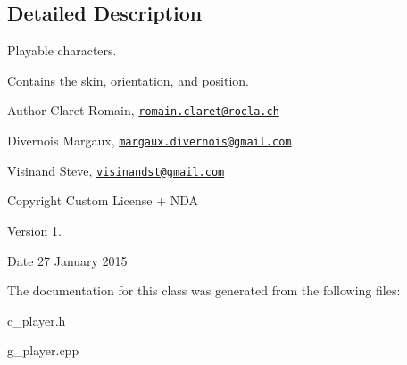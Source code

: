 \subsection{Detailed Description}
Playable characters. 

Contains the skin, orientation, and position. \begin{DoxyAuthor}{Author}
Claret Romain, \href{mailto:romain.claret@rocla.ch}{\tt romain.\+claret@rocla.\+ch} 

Divernois Margaux, \href{mailto:margaux.divernois@gmail.com}{\tt margaux.\+divernois@gmail.\+com} 

Visinand Steve, \href{mailto:visinandst@gmail.com}{\tt visinandst@gmail.\+com} 
\end{DoxyAuthor}
\begin{DoxyCopyright}{Copyright}
Custom License + N\+D\+A 
\end{DoxyCopyright}
\begin{DoxyVersion}{Version}
1. 
\end{DoxyVersion}
\begin{DoxyDate}{Date}
27 January 2015 
\end{DoxyDate}


The documentation for this class was generated from the following files\+:\begin{DoxyCompactItemize}
\item 
c\+\_\+player.\+h\item 
g\+\_\+player.\+cpp\end{DoxyCompactItemize}
